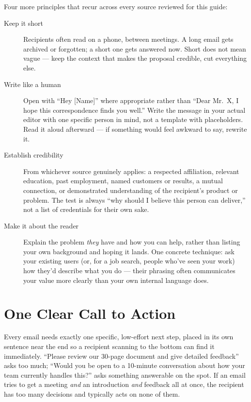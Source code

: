 Four more principles that recur across every source reviewed for this guide:

\begin{description}
  \item[Keep it short] Recipients often read on a phone, between meetings. A long email gets archived or
  forgotten; a short one gets answered now. Short does not mean vague — keep the context that makes the
  proposal credible, cut everything else.
  \item[Write like a human] Open with ``Hey [Name]'' where appropriate rather than ``Dear Mr.\ X, I hope this
  correspondence finds you well.'' Write the message in your actual editor with one specific person in mind,
  not a template with placeholders. Read it aloud afterward — if something would feel awkward to say, rewrite
  it.
  \item[Establish credibility] From whichever source genuinely applies: a respected affiliation, relevant
  education, past employment, named customers or results, a mutual connection, or demonstrated understanding of
  the recipient's product or problem. The test is always ``why should I believe this person can deliver,'' not
  a list of credentials for their own sake.
  \item[Make it about the reader] Explain the problem \emph{they} have and how you can help, rather than
  listing your own background and hoping it lands. One concrete technique: ask your existing users (or, for a
  job search, people who've seen your work) how they'd describe what you do — their phrasing often communicates
  your value more clearly than your own internal language does.
\end{description}

\section{One Clear Call to Action}

Every email needs exactly one specific, low-effort next step, placed in its own sentence near the end so a
recipient scanning to the bottom can find it immediately. ``Please review our 30-page document and give detailed
feedback'' asks too much; ``Would you be open to a 10-minute conversation about how your team currently handles
this?'' asks something answerable on the spot. If an email tries to get a meeting \emph{and} an introduction
\emph{and} feedback all at once, the recipient has too many decisions and typically acts on none of them.

